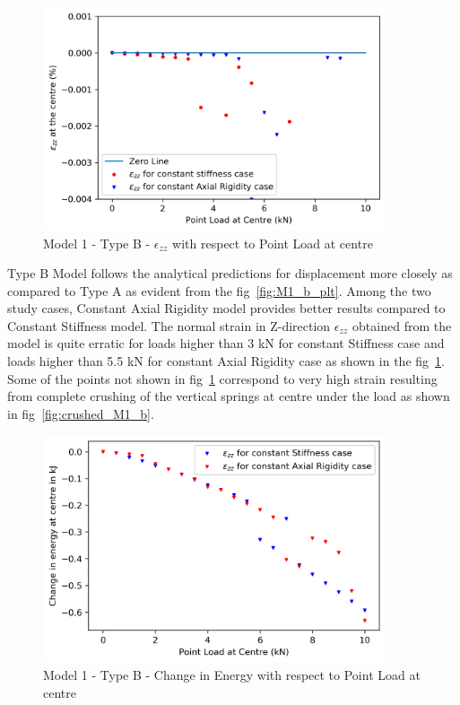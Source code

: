 \begin{figure}[!htbp]
    \centering
    \includegraphics[width = 0.9\textwidth]{Figures/M1_b_strain.png}
    \caption{Model 1 - Type B - $\epsilon_{zz}$ with respect to Point Load at centre}
    \label{fig:M1_b_strain_plt}
\end{figure}

Type B Model follows the analytical predictions for displacement more closely as compared to Type A as evident from the fig~\ref{fig:M1_b_plt}. Among the two study cases, Constant Axial Rigidity model provides better results compared to Constant Stiffness model. The normal strain in Z-direction $\epsilon_{zz}$ obtained from the model is quite erratic for loads higher than 3 kN for constant Stiffness case and loads higher than 5.5 kN for constant Axial Rigidity case as shown in the fig~\ref{fig:M1_b_strain_plt}. Some of the points not shown in fig~\ref{fig:M1_b_strain_plt} correspond to very high strain resulting from complete crushing of the vertical springs at centre under the load as shown in fig~\ref{fig:crushed_M1_b}.


\begin{figure}[!htbp]
    \centering
    \includegraphics[width = 0.9\textwidth]{Figures/M1_b_energy.png}
    \caption{Model 1 - Type B - Change in Energy with respect to Point Load at centre}
    \label{fig:M1_b_energy}
\end{figure}

